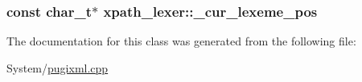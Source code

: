 \hypertarget{classxpath__lexer_a01e5586ea5b1bfa456cd5318bad9f793}{
\subsubsection[{\-\_\-cur\-\_\-lexeme\-\_\-pos}]{\setlength{\rightskip}{0pt plus 5cm}const char\-\_\-t$\ast$ xpath\-\_\-lexer\-::\-\_\-cur\-\_\-lexeme\-\_\-pos\hspace{0.3cm}{\ttfamily [private]}}}\label{classxpath__lexer_a01e5586ea5b1bfa456cd5318bad9f793}


The documentation for this class was generated from the following file\-:\begin{DoxyCompactItemize}
\item 
System/\hyperlink{pugixml_8cpp}{pugixml.\-cpp}\end{DoxyCompactItemize}
